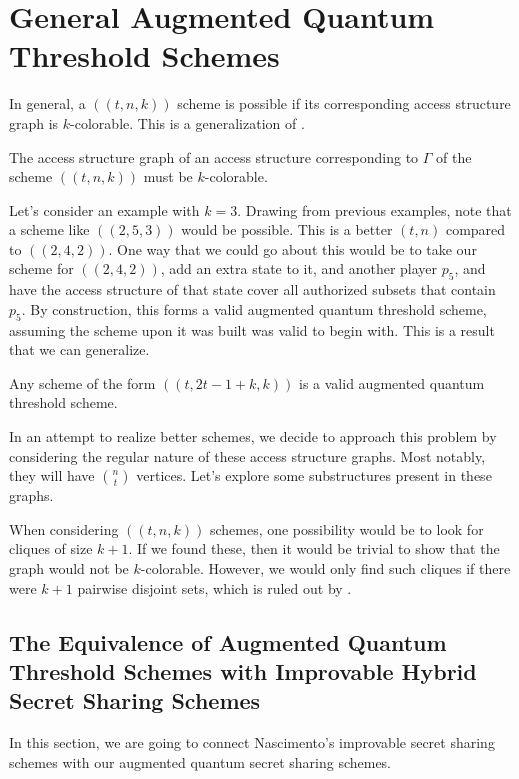 \chapter{General Augmented Quantum Threshold Schemes}
\label{ch4}

In general, a $((t,n,k))$ scheme is possible if its corresponding access structure graph is $k$-colorable. This is a generalization of .

\begin{theorem}
    \label{thm:k-color-access}
    The access structure graph of an access structure corresponding to $\Gamma$ of the scheme $((t,n,k))$ must be $k$-colorable.
\end{theorem}

Let's consider an example with $k=3$. Drawing from previous examples, note that a scheme like $((2,5,3))$ would be possible. This is a better $(t,n)$ compared to $((2,4,2))$. One way that we could go about this would be to take our scheme for $((2,4,2))$, add an extra state to it, and another player $p_5$, and have the access structure of that state cover all authorized subsets that contain $p_5$. By construction, this forms a valid augmented quantum threshold scheme, assuming the scheme upon it was built was valid to begin with. This is a result that we can generalize.

\begin{theorem}
    \label{} 
    Any scheme of the form $((t,2t-1+k,k))$ is a valid augmented quantum threshold scheme.
\end{theorem}

In an attempt to realize better schemes, we decide to approach this problem by considering the regular nature of these access structure graphs. Most notably, they will have $\binom{n}{t}$ vertices. Let's explore some substructures present in these graphs.

When considering $((t,n,k))$ schemes, one possibility would be to look for cliques of size $k+1$. If we found these, then it would be trivial to show that the graph would not be $k$-colorable. However, we would only find such cliques if there were $k+1$ pairwise disjoint sets, which is ruled out by . 


\section{The Equivalence of Augmented Quantum Threshold Schemes with Improvable Hybrid Secret Sharing Schemes}

In this section, we are going to connect Nascimento's improvable secret sharing schemes with our augmented quantum secret sharing schemes. 